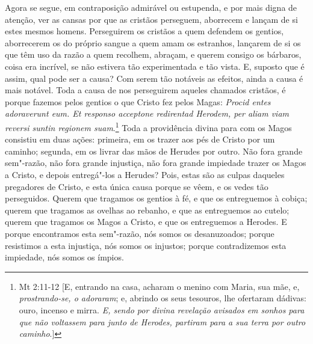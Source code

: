 Agora se segue, em contraposição admirável ou estupenda, e por mais
digna de atenção, ver as cansas por que as cristãos perseguem,
aborrecem e lançam de si estes mesmos homens. Perseguirem os cristãos a
quem defendem os gentios, aborrecerem os do próprio sangue a quem amam
os estranhos, lançarem de si os que têm uso da razão a quem recolhem,
abraçam, e querem consigo os bárbaros, coisa era incrível, se não
estivera tão experimentada e tão vista. E, suposto que é assim, qual
pode ser a causa? Com serem tão notáveis as efeitos, ainda a causa é
mais notável. Toda a causa de nos perseguirem aqueles chamados cristãos,
é porque fazemos pelos gentios o que Cristo fez pelos Magas:
\emph{Procid entes adoraverunt eum. Et responso acceptone
redirentad Herodem, per aliam viam reversi suntin regionem suam}.\footnote{Mt 2:11-12 [E, entrando na casa, acharam o menino com Maria, sua mãe, e, \emph{prostrando-se, o
adoraram}; e, abrindo os seus tesouros, lhe ofertaram dádivas: ouro, incenso e mirra. \emph{E, sendo por divina revelação avisados em sonhos para que não voltassem para junto de Herodes, partiram para a sua terra por outro caminho}.]}
Toda a providência divina para com os Magos consistiu em
duas ações: primeira, em os trazer aos pés de Cristo por um caminho;
segunda, em os livrar das mãos de Herudes por outro. Não fora grande
sem"-razão, não fora grande injustiça, não fora grande impiedade trazer
os Magos a Cristo, e depois entregá"-los a Herudes? Pois, estas são as
culpas daqueles pregadores de Cristo, e esta única causa porque se vêem,
e os vedes tão perseguidos. Querem que tragamos os gentios à fé, e que
os entreguemos à cobiça; querem que tragamos as ovelhas ao rebanho, e
que as entreguemos ao cutelo; querem que tragamos os Magos a Cristo, e
que os entreguemos a Herodes. E porque encontramos esta sem"-razão, nós
somos os desanuzoados; porque resistimos a esta injustiça, nós somos os
injustos; porque contradizemos esta impiedade, nós somos os ímpios.

